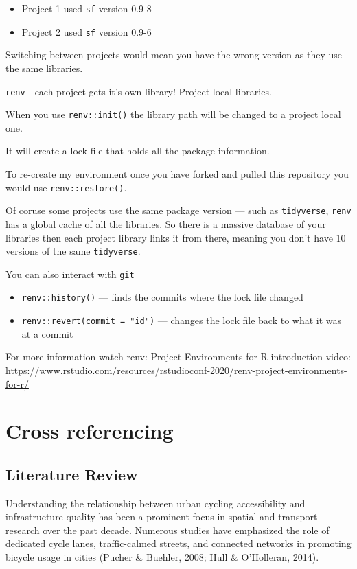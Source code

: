 \documentclass[
  12pt,
  oneside]{book}
\providecommand{\tightlist}{%
  \setlength{\itemsep}{0pt}\setlength{\parskip}{0pt}}
\begin{document}
\begin{itemize}
\tightlist
\item
  Project 1 used \texttt{sf} version 0.9-8
\item
  Project 2 used \texttt{sf} version 0.9-6
\end{itemize}

Switching between projects would mean you have the wrong version as they use the same libraries.

\texttt{renv} - each project gets it's own library! Project local libraries.

When you use \texttt{renv::init()} the library path will be changed to a project local one.

It will create a lock file that holds all the package information.

To re-create my environment once you have forked and pulled this repository you would use \texttt{renv::restore()}.

Of coruse some projects use the same package version --- such as \texttt{tidyverse}, \texttt{renv} has a global cache of all the libraries. So there is a massive database of your libraries then each project library links it from there, meaning you don't have 10 versions of the same \texttt{tidyverse}.

You can also interact with \texttt{git}

\begin{itemize}
\tightlist
\item
  \texttt{renv::history()} --- finds the commits where the lock file changed
\item
  \texttt{renv::revert(commit\ =\ "id")} --- changes the lock file back to what it was at a commit
\end{itemize}

For more information watch renv: Project Environments for R introduction video: \url{https://www.rstudio.com/resources/rstudioconf-2020/renv-project-environments-for-r/}

\chapter{Cross referencing}\label{crossref}

\section{Literature Review}\label{literature-review}

Understanding the relationship between urban cycling accessibility and infrastructure quality has been a prominent focus in spatial and transport research over the past decade. Numerous studies have emphasized the role of dedicated cycle lanes, traffic-calmed streets, and connected networks in promoting bicycle usage in cities (Pucher \& Buehler, 2008; Hull \& O'Holleran, 2014).
\end{document}
